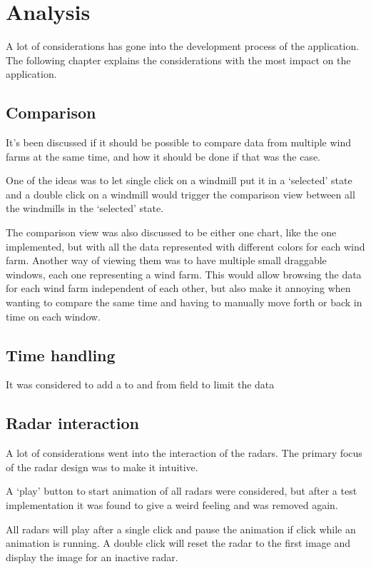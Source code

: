 \chapter{Analysis}
\label{sec:analysis}
A lot of considerations has gone into the development process of the application. The following chapter explains the considerations with the most impact on the application.

\section{Comparison}
It's been discussed if it should be possible to compare data from multiple wind farms at the same time, and how it should be done if that was the case.

One of the ideas was to let single click on a windmill put it in a `selected' state and a double click on a windmill would trigger the comparison view between all the windmills in the `selected' state.

The comparison view was also discussed to be either one chart, like the one implemented, but with all the data represented with different colors for each wind farm.
Another way of viewing them was to have multiple small draggable windows, each one representing a wind farm. This would allow browsing the data for each wind farm independent of each other, but also make it annoying when wanting to compare the same time and having to manually move forth or back in time on each window.

\section{Time handling}
It was considered to add a to and from field to limit the data

\section{Radar interaction}
A lot of considerations went into the interaction of the radars. The primary focus of the radar design was to make it intuitive.

A `play' button to start animation of all radars were considered, but after a test implementation it was found to give a weird feeling and was removed again.

All radars will play after a single click and pause the animation if click while an animation is running. A double click will reset the radar to the first image and display the image for an inactive radar.

